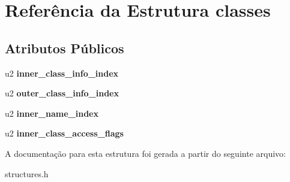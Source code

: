 \hypertarget{structclasses}{}\section{Referência da Estrutura classes}
\label{structclasses}
\subsection*{Atributos Públicos}
\begin{DoxyCompactItemize}
\item 
\mbox{\label{structclasses_a0b0500d3d12c2572e38ec03f4eb018cd}} 
u2 {\bfseries inner\+\_\+class\+\_\+info\+\_\+index}
\item 
\mbox{\label{structclasses_a0f25ecea2b18dfbcf23e4a6975eb1f21}} 
u2 {\bfseries outer\+\_\+class\+\_\+info\+\_\+index}
\item 
\mbox{\label{structclasses_a8cdb61a61adc9fc0d99acc9be0915187}} 
u2 {\bfseries inner\+\_\+name\+\_\+index}
\item 
\mbox{\label{structclasses_a493162e441680c04b835a3b31a371e5c}} 
u2 {\bfseries inner\+\_\+class\+\_\+access\+\_\+flags}
\end{DoxyCompactItemize}


A documentação para esta estrutura foi gerada a partir do seguinte arquivo\+:\begin{DoxyCompactItemize}
\item 
structures.\+h\end{DoxyCompactItemize}
